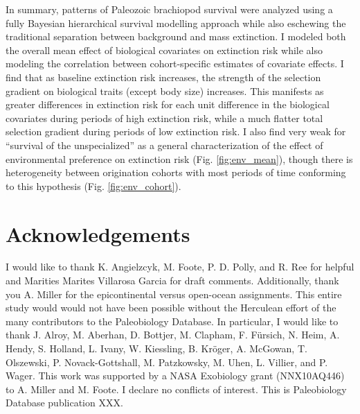 \documentclass{article}
\begin{document}
In summary, patterns of Paleozoic brachiopod survival were analyzed using a fully Bayesian hierarchical survival modelling approach while also eschewing the traditional separation between background and mass extinction. I modeled both the overall mean effect of biological covariates on extinction risk while also modeling the correlation between cohort-specific estimates of covariate effects. I find that as baseline extinction risk increases, the strength of the selection gradient on biological traits (except body size) increases. This manifests as greater differences in extinction risk for each unit difference in the biological covariates during periods of high extinction risk, while a much flatter total selection gradient during periods of low extinction risk. I also find very weak for ``survival of the unspecialized'' \citep{Simpson1944,Liow2004a,Liow2007b,Nurnberg2013a,Nurnberg2015} as a general characterization of the effect of environmental preference on extinction risk (Fig. \ref{fig:env_mean}), though there is heterogeneity between origination cohorts with most periods of time conforming to this hypothesis (Fig. \ref{fig:env_cohort}). 


\section*{Acknowledgements}
I would like to thank K. Angielzcyk, M. Foote, P. D. Polly, and R. Ree for helpful and Marities Marites Villarosa Garcia for draft comments. Additionally, thank you A. Miller for the epicontinental versus open-ocean assignments. This entire study would would not have been possible without the Herculean effort of the many contributors to the Paleobiology Database. In particular, I would like to thank J. Alroy, M. Aberhan, D. Bottjer, M. Clapham, F. F\"{u}rsich, N. Heim, A. Hendy, S. Holland, L. Ivany, W. Kiessling, B. Kr\"{o}ger, A. McGowan, T. Olszewski, P. Novack-Gottshall, M. Patzkowsky, M. Uhen, L. Villier, and P. Wager. This work was supported by a NASA Exobiology grant (NNX10AQ446) to A. Miller and M. Foote. I declare no conflicts of interest. This is Paleobiology Database publication XXX.

\clearpage




\clearpage
\end{document}

